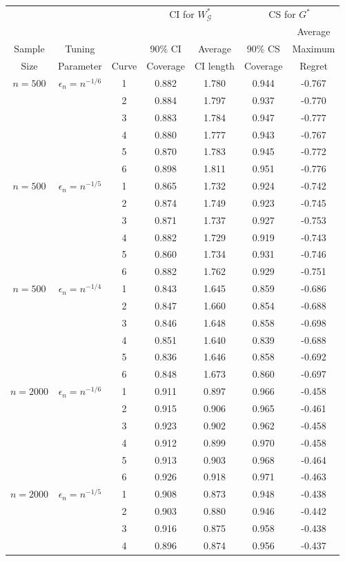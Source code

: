 \documentclass[12pt,oneside,reqno,english]{amsart}
\theoremstyle{definition}
\begin{document}
\begin{table}[H]
\vspace{0.5cm}
\begin{tabular}{ccc|cc|cc}
 &  & & \multicolumn{2}{c|}{CI for $W^{*}_{\mathcal{G}}$} & \multicolumn{2}{c}{CS for $G^{*}$}   \tabularnewline
                     &  &            &                  &                 &                           & Average                            \tabularnewline
 Sample                    & Tuning   &            & 90\% CI   & Average   & 90\% CS           & Maximum                          \tabularnewline
 Size & Parameter & Curve & Coverage & CI length  & Coverage & Regret          \tabularnewline
\hline 
$n=500$& $\epsilon_{n}=n^{-1/6}$ & 1 & 0.882 & 1.780 & 0.944  & -0.767  \tabularnewline
      & & 2 & 0.884 & 1.797 & 0.937  & -0.770   \tabularnewline
     &  & 3 & 0.883 & 1.784 & 0.947  & -0.777  \tabularnewline
     &  & 4 & 0.880 & 1.777 & 0.943  & -0.767  \tabularnewline
     &  & 5 & 0.870 & 1.783 & 0.945  & -0.772  \tabularnewline
     &  & 6 & 0.898 & 1.811 & 0.951  & -0.776  \tabularnewline
\hline 
$n=500$ & $\epsilon_{n}=n^{-1/5}$ & 1 & 0.865 & 1.732 & 0.924 & -0.742  \tabularnewline
      & & 2 & 0.874 & 1.749 & 0.923  & -0.745  \tabularnewline
      & & 3 & 0.871 & 1.737 & 0.927  & -0.753  \tabularnewline
      & & 4 & 0.882 & 1.729 & 0.919  & -0.743  \tabularnewline
     & & 5 & 0.860 & 1.734  & 0.931  & -0.746  \tabularnewline
     & & 6 & 0.882 & 1.762  & 0.929  & -0.751  \tabularnewline
\hline 
$n=500$& $\epsilon_{n}=n^{-1/4}$ & 1 & 0.843 & 1.645 & 0.859 & -0.686  \tabularnewline
     &  & 2 & 0.847 & 1.660 & 0.854  & -0.688  \tabularnewline
    & & 3 & 0.846 & 1.648 & 0.858  & -0.698  \tabularnewline
    &   & 4 & 0.851 & 1.640 & 0.839  & -0.688  \tabularnewline
    &  & 5 & 0.836 & 1.646  & 0.858  & -0.692  \tabularnewline
    &  & 6 & 0.848 & 1.673  & 0.860  & -0.697  \tabularnewline
\hline 
$n=2000$& $\epsilon_{n}=n^{-1/6}$ & 1 & 0.911 & 0.897 & 0.966  & -0.458  \tabularnewline
     &  & 2 & 0.915 & 0.906 & 0.965  & -0.461   \tabularnewline
    & & 3 & 0.923 & 0.902 & 0.962  & -0.458  \tabularnewline
    &   & 4 & 0.912 & 0.899 & 0.970  & -0.458  \tabularnewline
    &   & 5 & 0.913 & 0.903 & 0.968  & -0.464  \tabularnewline
     &  & 6 & 0.926 & 0.918 & 0.971  & -0.463  \tabularnewline
\hline 
$n=2000$ & $\epsilon_{n}=n^{-1/5}$ & 1 & 0.908 & 0.873 & 0.948 & -0.438  \tabularnewline
      & & 2 & 0.903 & 0.880 &  0.946 & -0.442  \tabularnewline
      & & 3 & 0.916 & 0.875 & 0.958  & -0.438  \tabularnewline
      & & 4 & 0.896 & 0.874 & 0.956  & -0.437  \tabularnewline

\end{tabular}
\end{table}
\end{document}
